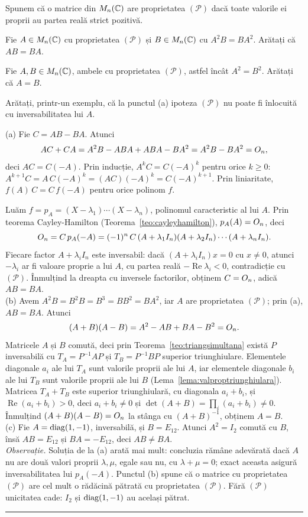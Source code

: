 Spunem că o matrice din $M_n(\mathbb{C})$ are proprietatea $(\mathcal{P})$ dacă toate valorile ei proprii au partea reală strict pozitivă.
\begin{parti}
  \item Fie $A\in M_n(\mathbb{C})$ cu proprietatea $(\mathcal{P})$ și $B\in M_n(\mathbb{C})$ cu $A^2B=BA^2$. Arătați că $AB=BA$.
  \item Fie $A,B\in M_n(\mathbb{C})$, ambele cu proprietatea $(\mathcal{P})$, astfel încât $A^2=B^2$. Arătați că $A=B$.
  \item Arătați, printr-un exemplu, că la punctul (a) ipoteza $(\mathcal{P})$ nu poate fi înlocuită cu inversabilitatea lui $A$.
\end{parti}
\sol (a) Fie $C=AB-BA$. Atunci
\[ AC+CA=A^2B-ABA+ABA-BA^2=A^2B-BA^2=O_n, \]
deci $AC=C(-A)$. Prin inducție, $A^kC=C(-A)^k$ pentru orice $k\ge0$: $A^{k+1}C=A\,C(-A)^k=(AC)(-A)^k=C(-A)^{k+1}$. Prin liniaritate, $f(A)\,C=C\,f(-A)$ pentru orice polinom $f$.

Luăm $f=p_A=(X-\lambda_1)\cdots(X-\lambda_n)$, polinomul caracteristic al lui $A$. Prin teorema Cayley-Hamilton (Teorema~\ref{teo:cayleyhamilton}), $p_A(A)=O_n$, deci
\[ O_n=C\,p_A(-A)=(-1)^n\,C\,(A+\lambda_1I_n)(A+\lambda_2I_n)\cdots(A+\lambda_nI_n). \]
Fiecare factor $A+\lambda_iI_n$ este inversabil: dacă $(A+\lambda_iI_n)x=0$ cu $x\neq0$, atunci $-\lambda_i$ ar fi valoare proprie a lui $A$, cu partea reală $-\operatorname{Re}\lambda_i<0$, contradicție cu $(\mathcal{P})$. Înmulțind la dreapta cu inversele factorilor, obținem $C=O_n$, adică $AB=BA$.\\[2pt]
(b) Avem $A^2B=B^2B=B^3=BB^2=BA^2$, iar $A$ are proprietatea $(\mathcal{P})$; prin (a), $AB=BA$. Atunci
\[ (A+B)(A-B)=A^2-AB+BA-B^2=O_n . \]
Matricele $A$ și $B$ comută, deci prin Teorema~\ref{teo:triangsimultana} există $P$ inversabilă cu $T_A=P^{-1}AP$ și $T_B=P^{-1}BP$ superior triunghiulare. Elementele diagonale $a_i$ ale lui $T_A$ sunt valorile proprii ale lui $A$, iar elementele diagonale $b_i$ ale lui $T_B$ sunt valorile proprii ale lui $B$ (Lema~\ref{lema:valproptriunghiulara}). Matricea $T_A+T_B$ este superior triunghiulară, cu diagonala $a_i+b_i$, și $\operatorname{Re}(a_i+b_i)>0$, deci $a_i+b_i\neq0$ și $\det(A+B)=\prod_i(a_i+b_i)\neq0$. Înmulțind $(A+B)(A-B)=O_n$ la stânga cu $(A+B)^{-1}$, obținem $A=B$.\\[2pt]
(c) Fie $A=\operatorname{diag}(1,-1)$, inversabilă, și $B=E_{12}$. Atunci $A^2=I_2$ comută cu $B$, însă $AB=E_{12}$ și $BA=-E_{12}$, deci $AB\neq BA$.\\[2pt]
\emph{Observație.} Soluția de la (a) arată mai mult: concluzia rămâne adevărată dacă $A$ nu are două valori proprii $\lambda,\mu$, egale sau nu, cu $\lambda+\mu=0$; exact aceasta asigură inversabilitatea lui $p_A(-A)$. Punctul (b) spune că o matrice cu proprietatea $(\mathcal{P})$ are cel mult o rădăcină pătrată cu proprietatea $(\mathcal{P})$. Fără $(\mathcal{P})$ unicitatea cade: $I_2$ și $\operatorname{diag}(1,-1)$ au același pătrat.
\vspace{1mm}\hrule

